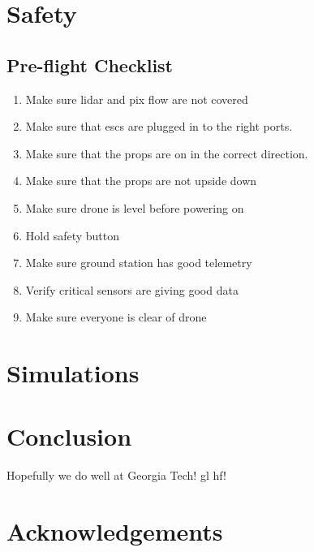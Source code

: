 \documentclass{article}
\begin{document}
\section{Safety}
\subsection{Pre-flight Checklist}
\begin{enumerate}
	\item Make sure lidar and pix flow are not covered
	\item Make sure that escs are plugged in to the right ports. 
	\item Make sure that the props are on in the correct direction. 
	\item Make sure that the props are not upside down
	\item Make sure drone is level before powering on
	\item Hold safety button
	\item Make sure ground station has good telemetry
	\item Verify critical sensors are giving good data
	\item Make sure everyone is clear of drone 
\end{enumerate}

\section{Simulations}

\section{Conclusion}

Hopefully we do well at Georgia Tech! gl hf! 

\section{Acknowledgements}



\end{document}
